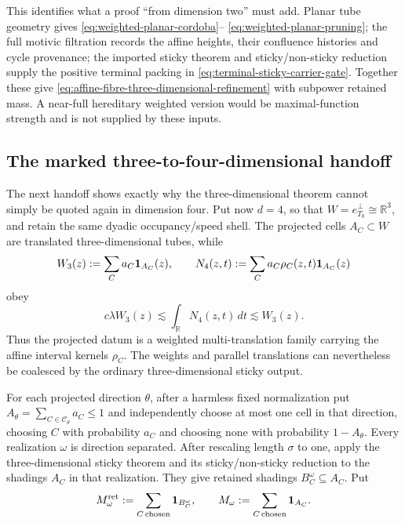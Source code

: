 \documentclass[11pt]{article}
\begin{document}
This identifies what a proof ``from dimension two'' must add.  Planar tube
geometry gives \eqref{eq:weighted-planar-cordoba}--%
\eqref{eq:weighted-planar-pruning}; the full motivic filtration records the
affine heights, their confluence histories and cycle provenance; the imported
sticky theorem and sticky/non-sticky reduction supply the positive terminal
packing in \eqref{eq:terminal-sticky-carrier-gate}.  Together these give
\eqref{eq:affine-fibre-three-dimensional-refinement} with subpower retained
mass.  A near-full hereditary weighted version would be maximal-function
strength and is not supplied by these inputs.

\subsection{The marked three-to-four-dimensional handoff}

The next handoff shows exactly why the three-dimensional theorem cannot simply
be quoted again in dimension four.  Put now \(d=4\), so that
\(W=e_{T_0}^{\perp}\cong\mathbb R^3\), and retain the same dyadic
occupancy/speed shell.  The projected cells \(A_C\subset W\) are translated
three-dimensional tubes, while
\begin{equation}\label{eq:marked-three-dimensional-source}
 W_3(z):=\sum_Ca_C{\bf1}_{A_C}(z),
 \qquad
 N_4(z,t):=\sum_Ca_C\rho_C(z,t){\bf1}_{A_C}(z)
\end{equation}
obey
\begin{equation}\label{eq:four-dimensional-fibre-marginal}
 c\lambda W_3(z)
 \lesssim \int_{\mathbb R}N_4(z,t)\,dt
 \lesssim W_3(z).
\end{equation}
Thus the projected datum is a weighted multi-translation family carrying the
affine interval kernels \(\rho_C\).  The weights and parallel translations can
nevertheless be coalesced by the ordinary three-dimensional sticky output.

For each projected direction \(\theta\), after a harmless fixed
normalization put
\(A_\theta=\sum_{C\in\mathcal C_\theta}a_C\le1\) and independently choose at
most one cell in that direction, choosing \(C\) with probability \(a_C\) and
choosing none with probability \(1-A_\theta\).  Every realization \(\omega\)
is direction separated.  After rescaling length \(\sigma\) to one, apply the
three-dimensional sticky theorem and its sticky/non-sticky reduction to the
shadings \(A_C\) in that realization.  They give retained shadings
\(B_C^\omega\subseteq A_C\).  Put
\[
 M_\omega^{\rm ret}
 :=\sum_{C\,\mathrm{chosen}}{\bf1}_{B_C^\omega},
 \qquad
 M_\omega:= \sum_{C\,\mathrm{chosen}}{\bf1}_{A_C}.
\]
\end{document}

